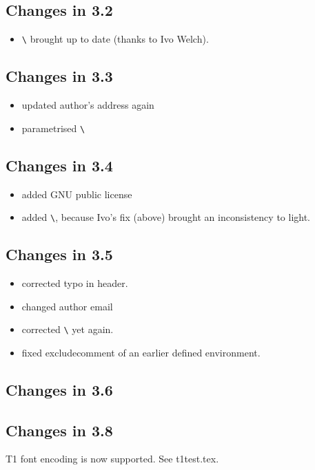 \documentclass[parskip=false, DIV=8, headings=normal, pagesize=auto]{artikel3}%
\makeatletter
\newcommand*{\cs}[1]{\texttt{\textbackslash#1}}
\newcommand*{\cmd}[1]{\cs{\expandafter\@gobble\string#1}}
\makeatother
\begin{document}
\subsection{Changes in 3.2}

\begin{itemize}
\item \cmd{\specialcomment} brought up to date (thanks to Ivo Welch).
\end{itemize}


\subsection{Changes in 3.3}

\begin{itemize}
\item updated author's address again
\item parametrised \cmd{\CommentCutFile}
\end{itemize}


\subsection{Changes in 3.4}

\begin{itemize}
\item added GNU public license
\item added \cmd{\processcomment}, because Ivo's fix (above) brought an
  inconsistency to light.
\end{itemize}

  
\subsection{Changes in 3.5}

\begin{itemize}
\item corrected typo in header.
\item changed author email
\item corrected \cmd{\specialcomment} yet again.
\item fixed excludecomment of an earlier defined environment.
\end{itemize}


\subsection{Changes in 3.6}



\subsection{Changes in 3.8}

T1 font encoding is now supported. See t1test.tex.
\end{document}

